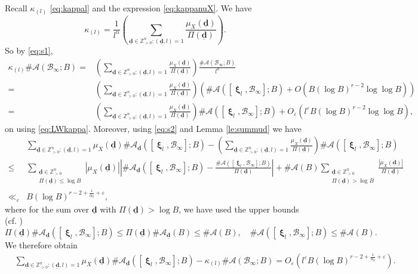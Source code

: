\documentclass[11pt,letterpaper]{amsart}
\newcommand{\BZ}{{\mathbb {Z}}}
\newcommand{\CA}{{\mathcal {A}}}
\newcommand{\CB}{{\mathcal {B}}}
\newcommand{\dd}{\underline{\mathbf{d}}}
\DeclareMathOperator{\bxi}{\mathbf{\xi}}
\theoremstyle{plain}
\numberwithin{equation}{section}
\theoremstyle{definition}
\theoremstyle{remark}
\begin{document}
	Recall $\kappa_{(l)}$ \eqref{eq:kappal} and the expression \eqref{eq:kappanuX}. We have $$\kappa_{(l)}=\frac{1}{l^n}\left(\sum_{\dd\in\BZ_{>0}^n:(\dd,l)=1}\frac{\mu_X(\dd)}{\Pi(\dd)}\right).$$ So by \eqref{eq:s1},
	\begin{align*}
		\kappa_{(l)}\#\CA(\CB_\infty;B)=&\left(\sum_{\dd\in\BZ_{>0}^n:(\dd,l)=1}\frac{\mu_X(\dd)}{\Pi(\dd)}\right)\frac{\#\CA(\CB_\infty;B)}{l^n}\\ =&\left(\sum_{\dd\in\BZ_{>0}^n:(\dd,l)=1}\frac{\mu_X(\dd)}{\Pi(\dd)}\right)\left(\#\CA([\bxi_l,\CB_\infty];B)+O(B(\log B)^{r-2}\log\log B)\right)\\ =&\left(\sum_{\dd\in\BZ_{>0}^n:(\dd,l)=1}\frac{\mu_X(\dd)}{\Pi(\dd)}\right)\#\CA([\bxi_l,\CB_\infty];B)+O_\varepsilon\left(l^\varepsilon B(\log B)^{r-2}\log\log B\right),
	\end{align*} on using \eqref{eq:LWkappa}.
	Moreover, using \eqref{eq:s2} and Lemma \ref{le:summud} we have 
	\begin{align*}
		&\sum_{\dd\in\BZ_{>0}^n:(\dd,l)=1}\mu_X(\dd)\#\CA_{\dd}([\bxi_l,\CB_\infty];B)-\left(\sum_{\dd\in\BZ_{>0}^n:(\dd,l)=1}\frac{\mu_X(\dd)}{\Pi(\dd)}\right)\#\CA([\bxi_l,\CB_\infty];B)\\ \leqslant&\sum_{\substack{\dd\in\BZ_{>0}^n\\\Pi(\dd)\leqslant \log B}}|\mu_X(\dd)|\left|\#\CA_{\dd}([\bxi_l,\CB_\infty];B)-\frac{\#\CA([\bxi_l,\CB_\infty];B)}{\Pi(\dd)}\right|+\#\CA(B)\sum_{\substack{\dd\in\BZ_{>0}^n\\\Pi(\dd)>\log B}}\frac{|\mu_X(\dd)|}{\Pi(\dd)}\\ \ll_\varepsilon& B(\log B)^{r-2+\frac{1}{\alpha_0}+\varepsilon},
	\end{align*} where for the sum over $\dd$ with $\Pi(\dd)>\log B$, we have used the upper bounds (cf. \cite[Lemma 11.26]{Salberger})
	$$\Pi(\dd)\#\CA_{\dd}([\bxi_l,\CB_\infty];B)\leqslant \Pi(\dd)\#\CA_{\dd}(B)\leqslant \#\CA(B),\quad \#\CA([\bxi_l,\CB_\infty];B)\leqslant \#\CA(B).$$
	We therefore obtain
	\begin{align*}
		&\sum_{\dd\in\BZ_{>0}^n:(\dd,l)=1}\mu_X(\dd)\#\CA_{\dd}([\bxi_l,\CB_\infty];B)-\kappa_{(l)}\#\CA(\CB_\infty;B)=O_\varepsilon(l^\varepsilon B(\log B)^{r-2+\frac{1}{\alpha_0}+\varepsilon}).
	\end{align*}
	
\end{document}
